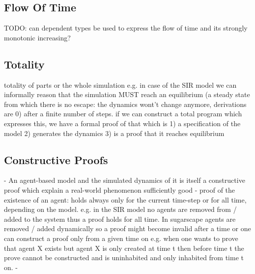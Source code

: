 \subsection{Flow Of Time}
TODO: can dependent types be used to express the flow of time and its strongly monotonic increasing?

\subsection{Totality}
totality of parts or the whole simulation e.g. in case of the SIR model we can informally reason that the simulation MUST reach an equilibrium (a steady state from which there is no escape: the dynamics wont't change anymore, derivations are 0) after a finite number of steps. if we can construct a total program which expresses this, we have a formal proof of that which is 1) a specification of the model 2) generates the dynamics 3) is a proof that it reaches equilibrium

\subsection{Constructive Proofs}
- An agent-based model and the simulated dynamics of it is itself a constructive proof which explain a real-world phenomenon sufficiently good
- proof of the existence of an agent: holds always only for the current time-step or for all time, depending on the model. e.g. in the SIR model no agents are removed from / added to the system thus a proof holds for all time. In sugarscape agents are removed / added dynamically so a proof might become invalid after a time or one can construct a proof only from a given time on e.g. when one wants to prove that agent X exists but agent X is only created at time t then before time t the prove cannot be constructed and is uninhabited and only inhabited from time t on.
- 